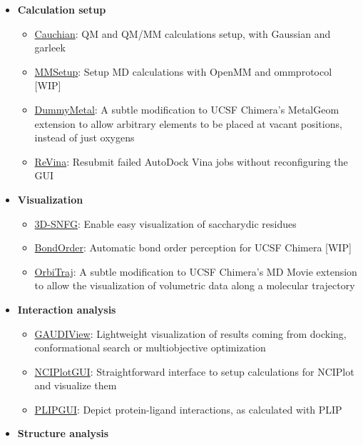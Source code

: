 \begin{itemize}
	\item \textbf{Calculation setup}

\begin{itemize}
	\item \uline{Cauchian}: QM and QM/MM calculations setup, with Gaussian and garleek

	\item \uline{MMSetup}: Setup MD calculations with OpenMM and ommprotocol [WIP]

	\item \uline{DummyMetal}: A subtle modification to UCSF Chimera’s MetalGeom extension to allow arbitrary elements to be placed at vacant positions, instead of just oxygens

	\item \uline{ReVina}: Resubmit failed AutoDock Vina jobs without reconfiguring the GUI


\end{itemize}
	\item \textbf{Visualization }

\begin{itemize}
	\item \uline{3D-SNFG}: Enable easy visualization of saccharydic residues

	\item \uline{BondOrder}: Automatic bond order perception for UCSF Chimera [WIP]

	\item \uline{OrbiTraj}: A subtle modification to UCSF Chimera’s MD Movie extension to allow the visualization of volumetric data along a molecular trajectory


\end{itemize}
	\item \textbf{Interaction analysis}

\begin{itemize}
	\item \uline{GAUDIView}: Lightweight visualization of results coming from docking, conformational search or multiobjective optimization

	\item \uline{NCIPlotGUI}: Straightforward interface to setup calculations for NCIPlot and visualize them

	\item \uline{PLIPGUI}: Depict protein-ligand interactions, as calculated with PLIP


\end{itemize}
	\item \textbf{Structure analysis}


\end{itemize}
